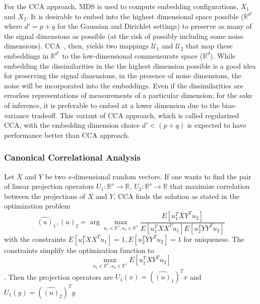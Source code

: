 \documentclass[12pt,oneside,final]{thesis}\usepackage[]{graphicx}\usepackage[]{color}
\begin{document}
For the CCA approach, MDS is used  to compute embedding configurations, $ X_1$ and $X_2$. It is desirable to  embed into the highest dimensional space  possible ($\mathbb{R}^{d'}$ where $d'=p+q$ for the Gaussian and Dirichlet settings)  to  preserve as many of the signal dimensions as possible (at the risk of possibly including  some noise dimensions). CCA~\cite{Hardoon2004}, then,  yields two mappings $\mathcal{U}_1$ and $\mathcal{U}_2$ that map these embeddings in $\mathbb{R}^{d'}$ to  the low-dimensional commensurate space ($\mathbb{R}^d$). 
While embedding the dissimilarities in the the highest dimension possible is a good idea for preserving the signal dimensions, in the presence of noise dimensions, the noise will be incorporated into the embeddings. Even if the dissimilarities are errorless representations of measurements of a particular dimension; for  the  sake of inference, it is preferable to embed at a lower  dimension due to the bias-variance tradeoff. This variant of CCA approach, which is called regularized CCA, with the  embedding dimension choice $d'< (p+q)$ is expected to have performance better than CCA approach.

\subsubsection*{Canonical Correlational Analysis}

 Let $X$ and $Y$ be two $s$-dimensional random vectors. If  one wants to find  the pair of linear projection operators $U_1:\mathbb{R}^s \rightarrow  \mathbb{R}$, $U_2 :\mathbb{R}^s \rightarrow  \mathbb{R}$ that maximize correlation between the projections of   $X$ and $Y$, CCA finds the solution as stated in the  optimization problem
$$
{\hat{(u)}_1 ,\hat{(u)}_2}=\arg\max_{u_1\in\mathbb{R}^s,u_2\in\mathbb{R}^s} {\frac{E[u_1^{T}XY^Tu_2]}{{E[u_1^{T}XX^T u_1]}{E[u_2^{T}YY^T u_2]}}}$$
with the constraints $E[{u_1^{T}XX^T u_1}]=1 , E[{u_2^{T}YY^T u_2}]=1$ for uniqueness. The constraints simplify the optimization function to $$
\max_{u_1\in \mathbb{R}^s,u_2\in \mathbb{R}^s} {E[u_1^{T}XY^Tu_2]}$$. Then the projection operators are $U_1(x)=(\hat{(u)}_1)^{T} x$ and $U_1(y)=(\hat{(u)}_2)^{T} y$
\end{document}
